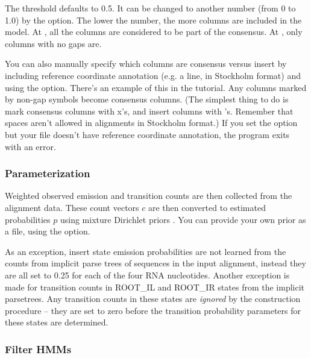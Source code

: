 The threshold defaults to 0.5. It can be changed to another number
 (from 0 to 1.0) by the  option.  The
lower the number, the more columns are included in the model.  At
, all the columns are considered to be part of
the consensus. At , only columns with no gaps are.

You can also manually specify which columns are consensus versus
insert by including reference coordinate annotation (e.g. a
 line, in Stockholm format) and using the
 option. There's an example of this in the tutorial. Any
columns marked by non-gap symbols become consensus columns. (The
simplest thing to do is mark consensus columns with x's, and insert
columns with 's. Remember that spaces aren't allowed in
alignments in Stockholm format.) If you set the  option but
your file doesn't have reference coordinate annotation, the program
exits with an error.

\subsubsection{Parameterization}

Weighted observed emission and transition counts are then collected
from the alignment data. These count vectors $c$ are then converted to
estimated probabilities $p$ using mixture Dirichlet priors
\citep{Sjolander96, Durbin98, NawrockiEddy07}. You can provide your
own prior as a file, using the  option.

As an exception, insert state emission probabilities are not learned
from the counts from implicit parse trees of sequences in the input
alignment, instead they are all set to 0.25 for each of the four RNA
nucleotides.  Another exception is made for transition counts in
ROOT\_IL and ROOT\_IR states from the implicit parsetrees. Any
transition counts in these states are \emph{ignored} by the
construction procedure -- they are set to zero before the transition
probability parameters for these states are determined.

\subsubsection{Filter HMMs}

